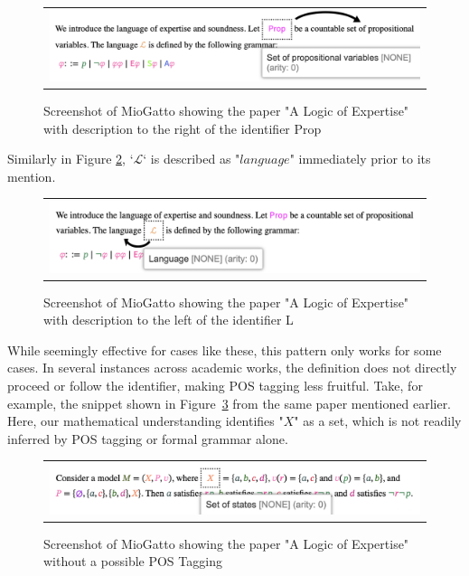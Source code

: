\begin{figure}[htpb]
  \centering
  \begin{tabular}{c}
  \includegraphics[width=14cm]{images/POS_right.png}
  \end{tabular}
  \caption[POS Tagging Right]{Screenshot of MioGatto showing the paper "A Logic of Expertise" with description to the right of the identifier Prop}\label{fig:POS_right}
\end{figure}

Similarly in Figure \ref{fig:POS_left}, `$\mathcal{L}$` is described as "$language$" immediately prior to its mention.

\begin{figure}[htpb]
  \centering
  \begin{tabular}{c}
  \includegraphics[width=14cm]{images/POS_left.png}
  \end{tabular}
  \caption[POS Tagging Left]{Screenshot of MioGatto showing the paper "A Logic of Expertise" with description to the left of the identifier L}\label{fig:POS_left}
\end{figure}

While seemingly effective for cases like these, this pattern only works for some cases. In several instances across academic works, the definition does not directly proceed or follow the identifier, making POS tagging less fruitful. Take, for example, the snippet shown in Figure~\ref{fig:POS_failed} from the same paper mentioned earlier. Here, our mathematical understanding identifies "$X$" as a set, which is not readily inferred by POS tagging or formal grammar alone.

\begin{figure}[htpb]
  \centering
  \begin{tabular}{c}
  \includegraphics[width=14cm]{images/POS_failed.png}
  \end{tabular}
  \caption[POS Tagging Left]{Screenshot of MioGatto showing the paper "A Logic of Expertise" without a possible POS Tagging}\label{fig:POS_failed}
\end{figure}

